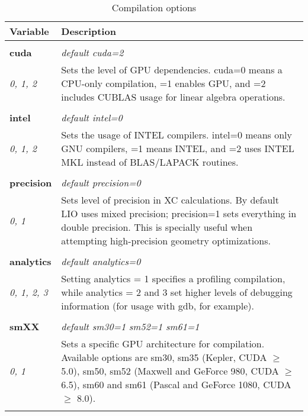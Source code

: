 \begin{Spacing}{1.0}
\begin{longtable}{ p{} p{} }

   \toprule
   \textbf{Variable} & Description \\*
   \midrule \\*
   \endhead

   \bottomrule
   \caption{Compilation options}
   \endfoot

   \textbf{cuda}
   &  \textit{default cuda=2}
   \\*\textit{0, 1, 2}
   & Sets the level of GPU dependencies. cuda=0 means a 
   CPU-only compilation, =1 enables GPU, and =2 includes
   CUBLAS usage for linear algebra operations. \\* \\

   \textbf{intel}
   &  \textit{default intel=0}
   \\*\textit{0, 1, 2}
   & Sets the usage of INTEL compilers. intel=0 means only
   GNU compilers, =1 means INTEL, and =2 uses INTEL MKL 
   instead of BLAS/LAPACK routines. \\* \\

   \textbf{precision}
   &  \textit{default precision=0}
   \\*\textit{0, 1}
   & Sets level of precision in XC calculations. By default
   LIO uses mixed precision; precision=1 sets everything in
   double precision. This is specially useful when attempting
   high-precision geometry optimizations.\\* \\

   \textbf{analytics}
   &  \textit{default analytics=0}
   \\*\textit{0, 1, 2, 3}
   & Setting analytics = 1 specifies a profiling compilation,
   while analytics = 2 and 3 set higher levels of debugging
   information (for usage with gdb, for example).
   \\* \\

   \textbf{smXX}
   &  \textit{default sm30=1 sm52=1 sm61=1}
   \\*\textit{0, 1}
   & Sets a specific GPU architecture for compilation. 
   Available options are sm30, sm35 (Kepler, CUDA $\geq$ 
   5.0), sm50, sm52 (Maxwell and GeForce 980, CUDA $\geq$
   6.5), sm60 and sm61 (Pascal and GeForce 1080, CUDA $\geq$
   8.0).
   \\* \\

\end{longtable}
\end{Spacing}
